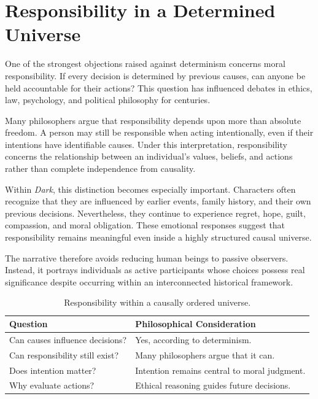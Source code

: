 \documentclass[12pt,oneside,openany]{book}
\begin{document}
\section{Responsibility in a Determined Universe}

One of the strongest objections raised against determinism concerns moral
responsibility. If every decision is determined by previous causes, can anyone
be held accountable for their actions? This question has influenced debates in
ethics, law, psychology, and political philosophy for centuries.

Many philosophers argue that responsibility depends upon more than absolute
freedom. A person may still be responsible when acting intentionally, even if
their intentions have identifiable causes. Under this interpretation,
responsibility concerns the relationship between an individual's values,
beliefs, and actions rather than complete independence from causality.

Within \textit{Dark}, this distinction becomes especially important. Characters
often recognize that they are influenced by earlier events, family history, and
their own previous decisions. Nevertheless, they continue to experience regret,
hope, guilt, compassion, and moral obligation. These emotional responses
suggest that responsibility remains meaningful even inside a highly structured
causal universe.

The narrative therefore avoids reducing human beings to passive observers.
Instead, it portrays individuals as active participants whose choices possess
real significance despite occurring within an interconnected historical
framework.

\begin{table}[H]
\centering
\begin{tabular}{|p{4cm}|p{8cm}|}
\hline
\textbf{Question} & \textbf{Philosophical Consideration}\\
\hline
Can causes influence decisions? & Yes, according to determinism.\\
\hline
Can responsibility still exist? & Many philosophers argue that it can.\\
\hline
Does intention matter? & Intention remains central to moral judgment.\\
\hline
Why evaluate actions? & Ethical reasoning guides future decisions.\\
\hline
\end{tabular}
\caption{Responsibility within a causally ordered universe.}
\end{table}
\end{document}
